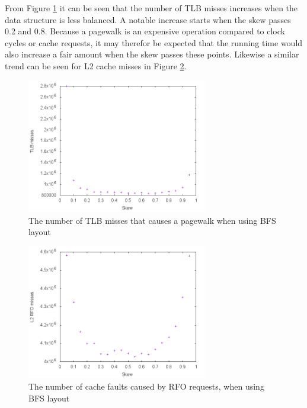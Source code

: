 \documentclass{article}
\begin{document}
From Figure \ref{fig:TLB_misses_BFS} it can be seen that the number of TLB misses increases when the data structure is less balanced. A notable increase starts when the skew passes 0.2 and 0.8. Because a pagewalk is an expensive operation compared to clock cycles or cache requests, it may therefor be expected that the running time would also increase a fair amount when the skew passes these points. Likewise a similar trend can be seen for L2 cache misses in Figure \ref{fig:L2_RFO_misses_BFS}.

\begin{figure}[H]
	\centering
	\includegraphics[width=0.7\textwidth]{figures/BFS_TLB_misses}
	\caption{The number of TLB misses that causes a pagewalk when using BFS layout}
	\label{fig:TLB_misses_BFS}
\end{figure}

\begin{figure}[H]
	\centering
	\includegraphics[width=0.7\textwidth]{figures/BFS_L2_RFO_misses}
	\caption{The number of cache faults caused by RFO requests, when using BFS layout}
	\label{fig:L2_RFO_misses_BFS}
\end{figure}
\end{document}

